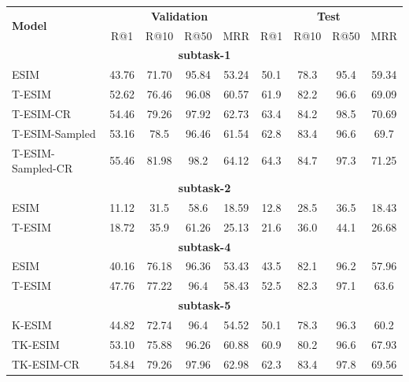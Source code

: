 \documentclass[letterpaper]{article} %
\begin{document}
\begin{table}[htbp!]
\begin{center}
\begin{tabular}{lcccc|cccc}
    \hline
    \multirow{2}{*}{\textbf{Model}} & \multicolumn{4}{c}{\textbf{Validation}} & \multicolumn{4}{c}{\textbf{Test}}\\
     & R@1 & R@10 & R@50 & MRR & R@1 & R@10 & R@50 & MRR  \\ \hline
    \multicolumn{9}{c}{\textbf{subtask-1}}\\\hline
    ESIM & 43.76 & 71.70 & 95.84 & 53.24 &  50.1 & 78.3 & 95.4 & 59.34 \\ \hline
    T-ESIM & 52.62 & 76.46 & 96.08 & 60.57 & 61.9 & 82.2 & 96.6 & 69.09\\ \hline
    T-ESIM-CR & 54.46 & 79.26 & 97.92 & 62.73 & 63.4 & 84.2 & 98.5 & 70.69\\ \hline
    T-ESIM-Sampled & 53.16 & 78.5 & 96.46 & 61.54 & 62.8 & 83.4 & 96.6 & 69.7\\ \hline
    T-ESIM-Sampled-CR & 55.46 & 81.98 & 98.2 & 64.12 & 64.3 & 84.7 & 97.3 & 71.25\\ \hline
    \multicolumn{9}{c}{\textbf{subtask-2}}\\\hline
    ESIM & 11.12 & 31.5 & 58.6 & 18.59 &  12.8 & 28.5 & 36.5 & 18.43 \\ \hline
    T-ESIM & 18.72 & 35.9 & 61.26 & 25.13 & 21.6 & 36.0 & 44.1 & 26.68 \\ \hline
    \multicolumn{9}{c}{\textbf{subtask-4}}\\\hline
    ESIM & 40.16 & 76.18 & 96.36 & 53.43 &  43.5 & 82.1 & 96.2 & 57.96 \\ \hline
    T-ESIM & 47.76 & 77.22 & 96.4 & 58.43 & 52.5 & 82.3 & 97.1 & 63.6 \\ \hline
    \multicolumn{9}{c}{\textbf{subtask-5}}\\\hline
    K-ESIM & 44.82 & 72.74 & 96.4 & 54.52 &  50.1 & 78.3 & 96.3 & 60.2 \\ \hline
    TK-ESIM & 53.10 & 75.88 & 96.26 & 60.88 & 60.9 & 80.2 & 96.6 & 67.93 \\ \hline
    TK-ESIM-CR & 54.84 & 79.26 & 97.96 & 62.98 & 62.3 & 83.4 & 97.8 & 69.56\\ \hline
    

\end{tabular}
\end{center}
\end{table}
\end{document}
